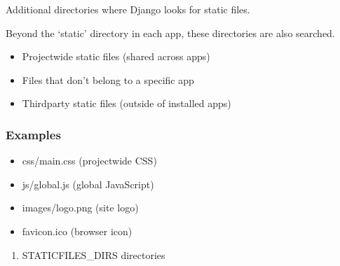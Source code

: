 \documentclass[letterpaper,10pt,english]{sphinxmanual}
\begin{document}
\begin{fulllineitems}
\label{\detokenize{softwareProject:softwareProject.settings.STATICFILES_DIRS}}
\pysigstartsignatures
\pysigline
{}
\pysigstopsignatures
\sphinxAtStartPar
Additional directories where Django looks for static files.

\sphinxAtStartPar
Beyond the ‘static’ directory in each app, these directories are also searched.
\begin{description}
\begin{itemize}
\item {} 
\sphinxAtStartPar
Project\sphinxhyphen{}wide static files (shared across apps)

\item {} 
\sphinxAtStartPar
Files that don’t belong to a specific app

\item {} 
\sphinxAtStartPar
Third\sphinxhyphen{}party static files (outside of installed apps)

\end{itemize}

\end{description}
\subsubsection*{Examples}
\begin{description}
\begin{itemize}
\item {} 
\sphinxAtStartPar
css/main.css (project\sphinxhyphen{}wide CSS)

\item {} 
\sphinxAtStartPar
js/global.js (global JavaScript)

\item {} 
\sphinxAtStartPar
images/logo.png (site logo)

\item {} 
\sphinxAtStartPar
favicon.ico (browser icon)

\end{itemize}

\begin{enumerate}
%
\item {} 
\sphinxAtStartPar
STATICFILES\_DIRS directories


\end{enumerate}
\end{description}
\end{fulllineitems}
\end{document}
